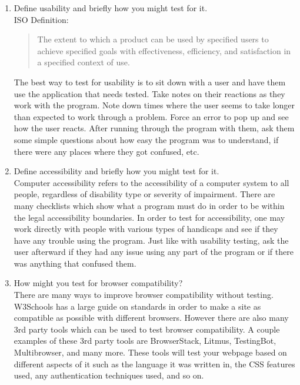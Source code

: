 \documentclass[12pt]{article}
\theoremstyle{plain}
\theoremstyle{definition}
\theoremstyle{plain}
\begin{document}
\begin{enumerate}
\item Define usability and briefly how you might test for it.\\
	ISO Definition: 
	\begin{quote}
	The extent to which a product can be used by specified users to achieve specified goals with effectiveness, efficiency, and satisfaction in a specified context of use.	
	\end{quote}
	The best way to test for usability is to sit down with a user and have them use the application that needs tested. Take notes on their reactions as they work with the program. Note down times where the user seems to take longer than expected to work through a problem. Force an error to pop up and see how the user reacts. After running through the program with them, ask them some simple questions about how easy the program was to understand, if there were any places where they got confused, etc. 

\item Define accessibility and briefly how you might test for it.\\
	Computer accessibility refers to the accessibility of a computer system to all people, regardless of disability type or severity of impairment. There are many checklists which show what a program must do in order to be within the legal accessibility boundaries. In order to test for accessibility, one may work directly with people with various types of handicaps and see if they have any trouble using the program. Just like with usability testing, ask the user afterward if they had any issue using any part of the program or if there was anything that confused them.

\item How might you test for browser compatibility?\\
	There are many ways to improve browser compatibility without testing. W3Schools has a large guide on standards in order to make a site as compatible as possible with different browsers. However there are also many 3rd party tools which can be used to test browser compatibility. A couple examples of these 3rd party tools are BrowserStack, Litmus, TestingBot, Multibrowser, and many more. These tools will test your webpage based on different aspects of it such as the language it was written in, the CSS features used, any authentication techniques used, and so on.
	

\end{enumerate}
\end{document}
